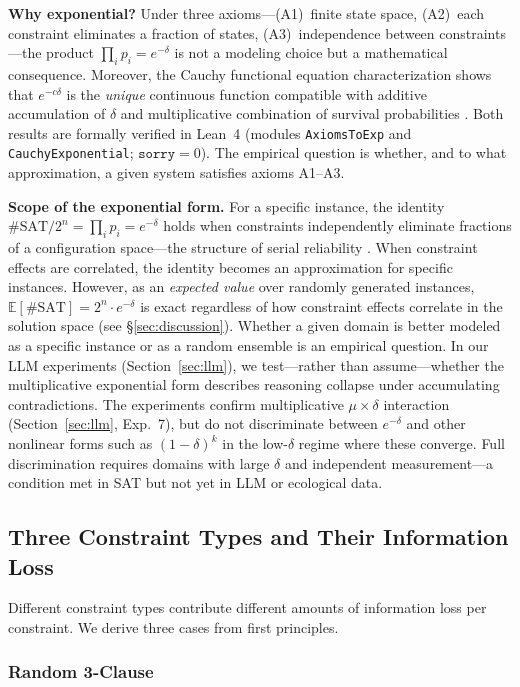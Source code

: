 \documentclass[11pt,a4paper]{article}
\begin{document}
\textbf{Why exponential?} Under three axioms---(A1)~finite state space, (A2)~each constraint eliminates a fraction of states, (A3)~independence between constraints---the product $\prod_i p_i = e^{-\delta}$ is not a modeling choice but a mathematical consequence. Moreover, the Cauchy functional equation characterization shows that $e^{-c\delta}$ is the \emph{unique} continuous function compatible with additive accumulation of $\delta$ and multiplicative combination of survival probabilities \citep{aczel1966}. Both results are formally verified in Lean~4 (modules \texttt{AxiomsToExp} and \texttt{CauchyExponential}; $\texttt{sorry} = 0$). The empirical question is whether, and to what approximation, a given system satisfies axioms A1--A3.

\textbf{Scope of the exponential form.} For a specific instance, the identity $\#\text{SAT}/2^n = \prod_i p_i = e^{-\delta}$ holds when constraints independently eliminate fractions of a configuration space---the structure of serial reliability \citep{barlow1975}. When constraint effects are correlated, the identity becomes an approximation for specific instances. However, as an \emph{expected value} over randomly generated instances, $\mathbb{E}[\#\text{SAT}] = 2^n \cdot e^{-\delta}$ is exact regardless of how constraint effects correlate in the solution space (see \S\ref{sec:discussion}). Whether a given domain is better modeled as a specific instance or as a random ensemble is an empirical question. In our LLM experiments (Section~\ref{sec:llm}), we test---rather than assume---whether the multiplicative exponential form describes reasoning collapse under accumulating contradictions. The experiments confirm multiplicative $\mu \times \delta$ interaction (Section~\ref{sec:llm}, Exp.~7), but do not discriminate between $e^{-\delta}$ and other nonlinear forms such as $(1-\delta)^k$ in the low-$\delta$ regime where these converge. Full discrimination requires domains with large $\delta$ and independent measurement---a condition met in SAT but not yet in LLM or ecological data.

\subsection{Three Constraint Types and Their Information Loss}

Different constraint types contribute different amounts of information loss per constraint. We derive three cases from first principles.

\subsubsection{Random 3-Clause}
\end{document}
